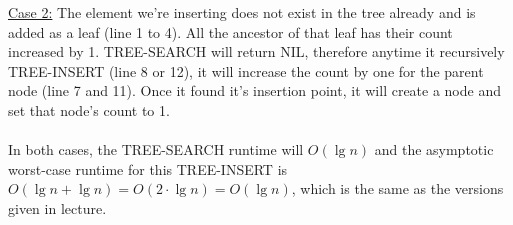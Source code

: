 \documentclass{article}
\begin{document}
\underline{Case 2:} The element we're inserting does not exist in the tree already and is added as a leaf (line 1 to 4). All the ancestor of that leaf has their count increased by 1. TREE-SEARCH will return NIL, therefore anytime it recursively TREE-INSERT (line 8 or 12), it will increase the count by one for the parent node (line 7 and 11). Once it found it's insertion point, it will create a node and set that node's count to 1. \\~\\
In both cases, the TREE-SEARCH runtime will $O(\lg n)$ and the asymptotic worst-case runtime for this TREE-INSERT is $O(\lg n + \lg n) = O(2\cdot\lg n) = O(\lg n)$, which is the same as the versions given in lecture.


\newpage
\begin{enumerate}[itemsep=0pt,parsep=0pt]

\end{enumerate}
\end{document}
